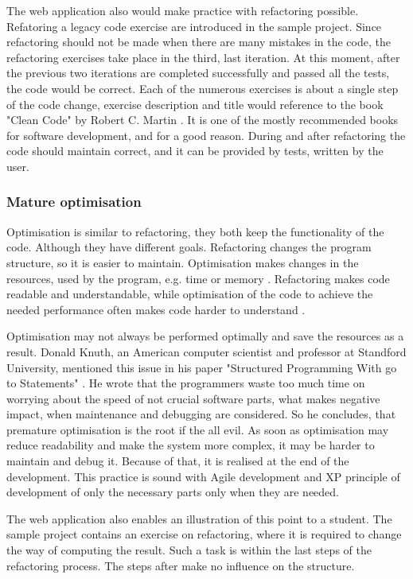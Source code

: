 The web application also would make practice with refactoring possible. Refatoring a legacy code exercise are introduced in the sample project. Since refactoring should not be made when there are many mistakes in the code, the refactoring exercises take place in the third, last iteration. At this moment, after the previous two iterations are completed successfully and passed all the tests, the code would be correct. Each of the numerous exercises is about a single step of the code change, exercise description and title would reference to the book "Clean Code" by Robert C. Martin \cite{clean_code}. It is one of the mostly recommended books for software development, and for a good reason. During and after refactoring the code should maintain correct, and it can be provided by tests, written by the user.

\subsubsection{Mature optimisation}

Optimisation is similar to refactoring, they both keep the functionality of the code. Although they have different goals. Refactoring changes the program structure, so it is easier to maintain. Optimisation makes changes in the resources, used by the program, e.g. time or memory \cite{lc_effectively}. Refactoring makes code readable and understandable, while optimisation of the code to achieve the needed performance often makes code harder to understand \cite{ref_ec}.

Optimisation may not always be performed optimally and save the resources as a result. Donald Knuth, an American computer scientist and professor at Standford University, mentioned this issue in his paper "Structured Programming With go to Statements" \cite{knuth_goto}. He wrote that the programmers waste too much time on worrying about the speed of not crucial software parts, what makes negative impact, when maintenance and debugging are considered. So he concludes, that premature optimisation is the root if the all evil. As soon as optimisation may reduce readability and make the system more complex, it may be harder to maintain and debug it. Because of that, it is realised at the end of the development. This practice is sound with Agile development and XP principle of development of only the necessary parts only when they are needed.

The web application also enables an illustration of this point to a student. The sample project contains an exercise on refactoring, where it is required to change the way of computing the result. Such a task is within the last steps of the refactoring process. The steps after make no influence on the structure.

